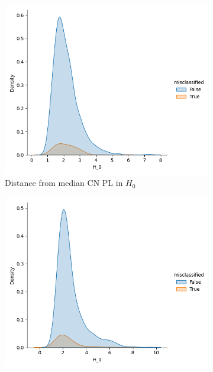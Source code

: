 \documentclass{article}
\begin{document}
\begin{figure}
  \centering
  \begin{subfigure}{0.32\textwidth}
    \includegraphics[width=\textwidth]{figures/misclassification_distance/distribution_distance_misclassified_CN_H_0.png}
    \caption{Distance from median CN PL in $H_0$}
  \end{subfigure}
  \begin{subfigure}{0.32\textwidth}
    \includegraphics[width=\textwidth]{figures/misclassification_distance/distribution_distance_misclassified_CN_H_1.png}

\end{subfigure}
\end{figure}
\end{document}
